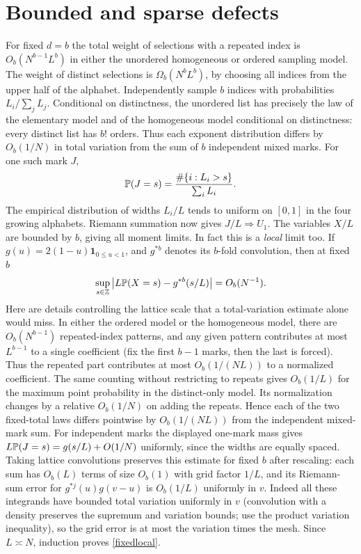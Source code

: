 \documentclass[11pt]{article}
\begin{document}
\section{Bounded and sparse defects}
For fixed $d=b$ the total weight of selections with a repeated index is $O_b(N^{b-1}L^b)$ in either the unordered homogeneous or ordered sampling model. The weight of distinct selections is $\Omega_b(N^b L^b)$, by choosing all indices from the upper half of the alphabet. Independently sample $b$ indices with probabilities $L_i/\sum_jL_j$. Conditional on distinctness, the unordered list has precisely the law of the elementary model and of the homogeneous model conditional on distinctness: every distinct list has $b!$ orders. Thus each exponent distribution differs by $O_b(1/N)$ in total variation from the sum of $b$ independent mixed marks. For one such mark $J$,
\[
\mathbb P(J=s)=\frac{\#\{i:L_i>s\}}{\sum_i L_i}.
\]
The empirical distribution of widths $L_i/L$ tends to uniform on $[0,1]$ in the four growing alphabets. Riemann summation now gives $J/L\Rightarrow U_1$. The variables $X/L$ are bounded by $b$, giving all moment limits.
In fact this is a \emph{local} limit too. If $g(u)=2(1-u)\mathbf1_{0\le u<1}$, and $g^{*b}$ denotes its $b$-fold convolution, then at fixed $b$
\begin{equation}
\sup_{s\in\mathbb Z}\left|L\mathbb P(X=s)-g^{*b}(s/L)\right|=O_b(N^{-1}).\label{fixedlocal}
\end{equation}
Here are details controlling the lattice scale that a total-variation estimate alone would miss. In either the ordered model or the homogeneous model, there are $O_b(N^{b-1})$ repeated-index patterns, and any given pattern contributes at most $L^{b-1}$ to a single coefficient (fix the first $b-1$ marks, then the last is forced). Thus the repeated part contributes at most $O_b(1/(NL))$ to a normalized coefficient. The same counting without restricting to repeats gives $O_b(1/L)$ for the maximum point probability in the distinct-only model. Its normalization changes by a relative $O_b(1/N)$ on adding the repeats. Hence each of the two fixed-total laws differs pointwise by $O_b(1/(NL))$ from the independent mixed-mark sum. For independent marks the displayed one-mark mass gives $L\mathbb P(J=s)=g(s/L)+O(1/N)$ uniformly, since the widths are equally spaced. Taking lattice convolutions preserves this estimate for fixed $b$ after rescaling: each sum has $O_b(L)$ terms of size $O_b(1)$ with grid factor $1/L$, and its Riemann-sum error for $g^{*j}(u)g(v-u)$ is $O_b(1/L)$ uniformly in $v$. Indeed all these integrands have bounded total variation uniformly in $v$ (convolution with a density preserves the supremum and variation bounds; use the product variation inequality), so the grid error is at most the variation times the mesh. Since $L\asymp N$, induction proves \eqref{fixedlocal}.
\end{document}

